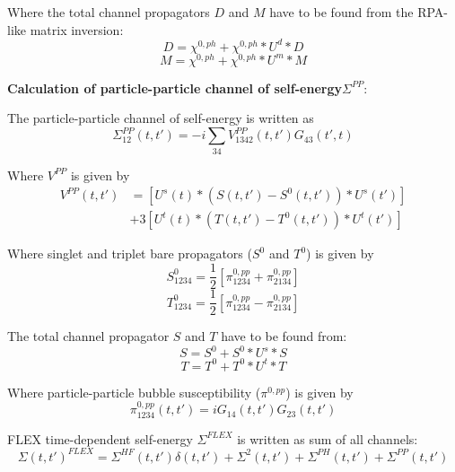 Where the total channel propagators $D$ and $M$ have to be found from the RPA-like matrix inversion:
\begin{equation}
D = \chi^{0,ph} + \chi^{0,ph} * U^d * D
\end{equation}
\begin{equation}
M = \chi^{0,ph} + \chi^{0,ph} * U^m * M
\end{equation}

\vspace*{0.2cm}
{\bf Calculation of particle-particle channel of self-energy$\Sigma^{PP}$}:

The particle-particle channel of self-energy is written as 
\begin{equation}
\Sigma^{PP}_{12}(t,t') = -i \sum_{34} V^{PP}_{1342}(t,t') G_{43} (t',t) 
\end{equation}

Where $V^{PP}$ is given by
\begin{subequations}
\begin{align}
V^{PP}(t,t')
&=
	[U^s(t)*(S(t,t')-S^{0}(t,t'))*U^s(t')]
		\nonumber
		\\
 &+
3[U^t(t)*(T(t,t')-T^{0}(t,t'))*U^t(t')] %
\end{align}
\end{subequations}


Where singlet and triplet bare propagators ($S^0$ and $T^0$) is given by
\begin{equation}
S^0_{1234} = \frac{1}{2} [ \pi^{0,pp}_{1234} + \pi^{0,pp}_{2134} ]
\end{equation}
\begin{equation}
T^0_{1234} = \frac{1}{2} [ \pi^{0,pp}_{1234} - \pi^{0,pp}_{2134} ]
\end{equation}

The total channel propagator $S$ and $T$ have to be found from:
\begin{equation}
S =S^0 + S^0 * U^s * S
\end{equation}
\begin{equation}
T =T^0 + T^0 * U^t * T
\end{equation}

Where particle-particle bubble susceptibility ($\pi^{0,pp}$) is given by 
\begin{equation}
\pi^{0,pp}_{1234}(t,t') = i G_{14}(t,t') G_{23}(t,t')
\end{equation} 

FLEX time-dependent self-energy $\Sigma^{FLEX}$ is written as sum of all channels:
\begin{equation}
\Sigma(t,t')^{FLEX} = \Sigma^{HF}(t,t')\delta(t,t')+ \Sigma^{2}(t,t') + \Sigma^{PH}(t,t') + \Sigma^{PP}(t,t')
\end{equation}

